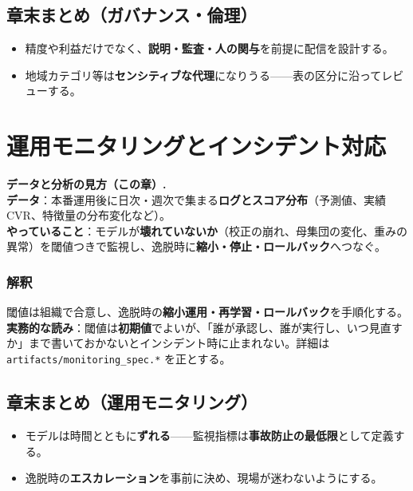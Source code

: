 \documentclass[11pt,a4paper]{article}
\begin{document}


\subsection*{章末まとめ（ガバナンス・倫理）}
\begin{itemize}\setlength{\itemsep}{0.2em}
  \item 精度や利益だけでなく、\textbf{説明・監査・人の関与}を前提に配信を設計する。
  \item 地域カテゴリ等は\textbf{センシティブな代理}になりうる——表の区分に沿ってレビューする。
\end{itemize}

\FloatBarrier
\section{運用モニタリングとインシデント対応}

\noindent\textbf{データと分析の見方（この章）.}\\
\textbf{データ}：本番運用後に日次・週次で集まる\textbf{ログとスコア分布}（予測値、実績CVR、特徴量の分布変化など）。\\
\textbf{やっていること}：モデルが\textbf{壊れていないか}（校正の崩れ、母集団の変化、重みの異常）を閾値つきで監視し、逸脱時に\textbf{縮小・停止・ロールバック}へつなぐ。\\
\begin{table}[!ht]
\centering
\caption{監視指標の例（詳細は \texttt{artifacts/monitoring\_spec.*}）}
\small

\end{table}

\FloatBarrier
\subsubsection*{解釈}
閾値は組織で合意し、逸脱時の\textbf{縮小運用・再学習・ロールバック}を手順化する。
\textbf{実務的な読み}：閾値は\textbf{初期値}でよいが、「誰が承認し、誰が実行し、いつ見直すか」まで書いておかないとインシデント時に止まれない。詳細は \texttt{artifacts/monitoring\_spec.*} を正とする。

\subsection*{章末まとめ（運用モニタリング）}
\begin{itemize}\setlength{\itemsep}{0.2em}
  \item モデルは時間とともに\textbf{ずれる}——監視指標は\textbf{事故防止の最低限}として定義する。
  \item 逸脱時の\textbf{エスカレーション}を事前に決め、現場が迷わないようにする。
\end{itemize}
\end{document}
